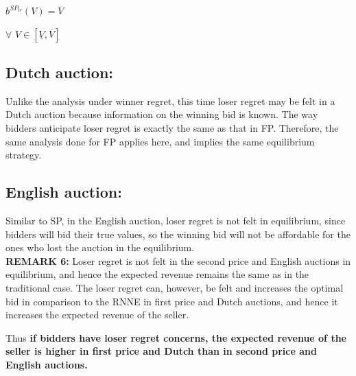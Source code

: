 \documentclass[10pt,a4paper,oneside]{report}
\begin{document}
\noindent $b^{{SP}_{lr}}(V)= V$  

\begin{flushright}
$\forall$ $V\in [\underline{V} , \overline{V}]$\end{flushright}
\subsection{Dutch auction:}
Unlike the analysis under winner regret, this time loser regret may be felt in a Dutch auction because information on the winning bid is known. The way bidders anticipate loser regret is exactly the same as that in FP. Therefore, the same analysis done for FP applies here, and implies the same equilibrium strategy.

\subsection{English auction:}
Similar to SP, in the English auction, loser regret is not felt in equilibrium, since bidders will bid their true values, so the winning bid will not be affordable for the ones who lost the auction in the equilibrium.\\[3mm]

\noindent \textbf{REMARK 6:} Loser regret is not felt in the second price and English auctions in equilibrium, and hence the expected revenue remains the same as in the traditional case. The loser regret can, however, be felt and increases the optimal bid in comparison to the RNNE in first price and Dutch auctions, and hence it increases the expected revenue of the seller.\citep{filizy2005auctions}

\noindent Thus \textbf{if bidders have loser regret concerns, the expected revenue of the seller is higher in first price and Dutch than in second price and English auctions.}
\end{document}
